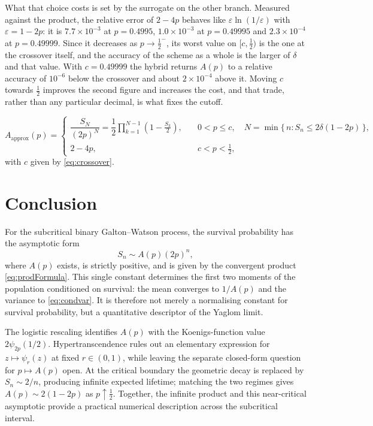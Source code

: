 \documentclass[11pt]{article}
\begin{document}
What that choice costs is set by the surrogate on the other branch. Measured
against the product, the relative error of $2-4p$ behaves like
$\varepsilon\ln(1/\varepsilon)$ with $\varepsilon=1-2p$: it is $7.7\times10^{-3}$ at
$p=0.4995$, $1.0\times10^{-3}$ at $p=0.49995$ and $2.3\times10^{-4}$ at
$p=0.49999$. Since it decreases as $p\to\tfrac12^-$, its worst value on
$[c,\tfrac12)$ is the one at the crossover itself, and the accuracy of the scheme
as a whole is the larger of $\delta$ and that value. With $c=0.49999$ the hybrid
returns $A(p)$ to a relative accuracy of $10^{-6}$ below the crossover and about
$2\times10^{-4}$ above it. Moving $c$ towards $\tfrac12$ improves the second figure
and increases the cost, and that trade, rather than any particular decimal, is what
fixes the cutoff.

\begin{equation}
    A_{\mathrm{approx}}(p) =
\begin{cases}
\dfrac{S_N}{(2p)^N}=\dfrac{1}{2}\displaystyle\prod_{k=1}^{N-1}\left(1-\frac{S_k}{2}\right),
\quad &0<p\le c,\quad N=\min\{\,n:S_n\le2\delta(1-2p)\,\},\\[4mm]
2-4p, \quad& c<p<\tfrac12 ,
\end{cases}
\label{eq:hybrid}
\end{equation}
with $c$ given by \eqref{eq:crossover}.





\section{Conclusion}

For the subcritical binary Galton--Watson process, the survival probability has the
asymptotic form
\[
S_n\sim A(p)(2p)^n,
\]
where $A(p)$ exists, is strictly positive, and is given by the convergent product
\eqref{eq:prodFormula}. This single constant determines the first two moments of
the population conditioned on survival: the mean converges to $1/A(p)$ and the
variance to \eqref{eq:condvar}. It is therefore not merely a normalising constant
for survival probability, but a quantitative descriptor of the Yaglom limit.

The logistic rescaling identifies $A(p)$ with the Koenigs-function value
$2\psi_{2p}(1/2)$. Hypertranscendence rules out an elementary expression for
$z\mapsto\psi_r(z)$ at fixed $r\in(0,1)$, while leaving the separate closed-form
question for $p\mapsto A(p)$ open. At the critical boundary the geometric decay is
replaced by $S_n\sim2/n$, producing infinite expected lifetime; matching the two
regimes gives $A(p)\sim2(1-2p)$ as $p\uparrow\tfrac12$. Together, the infinite
product and this near-critical asymptotic provide a practical numerical description
across the subcritical interval.
\end{document}
